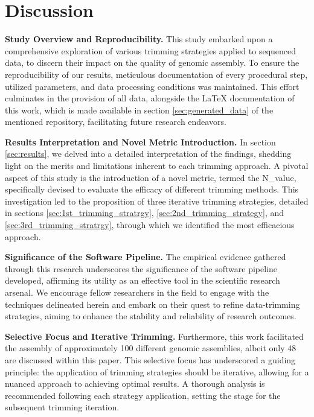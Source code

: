 \chapter{Discussion}

\textbf{Study Overview and Reproducibility.} This study embarked upon a comprehensive exploration of various trimming strategies applied to sequenced data, to discern their impact on the quality of genomic assembly. To ensure the reproducibility of our results, meticulous documentation of every procedural step, utilized parameters, and data processing conditions was maintained. This effort culminates in the provision of all data, alongside the LaTeX documentation of this work, which is made available in section \ref{sec:generated_data} of the mentioned repository, facilitating future research endeavors.

\textbf{Results Interpretation and Novel Metric Introduction.} In section \ref{sec:results}, we delved into a detailed interpretation of the findings, shedding light on the merits and limitations inherent to each trimming approach. A pivotal aspect of this study is the introduction of a novel metric, termed the N\_value, specifically devised to evaluate the efficacy of different trimming methods. This investigation led to the proposition of three iterative trimming strategies, detailed in sections \ref{sec:1st_trimming_stratrgy}, \ref{sec:2nd_trimming_strategy}, and \ref{sec:3rd_trimming_stratrgy}, through which we identified the most efficacious approach.

\textbf{Significance of the Software Pipeline.} The empirical evidence gathered through this research underscores the significance of the software pipeline developed, affirming its utility as an effective tool in the scientific research arsenal. We encourage fellow researchers in the field to engage with the techniques delineated herein and embark on their quest to refine data-trimming strategies, aiming to enhance the stability and reliability of research outcomes.

\textbf{Selective Focus and Iterative Trimming.} Furthermore, this work facilitated the assembly of approximately 100 different genomic assemblies, albeit only 48 are discussed within this paper. This selective focus has underscored a guiding principle: the application of trimming strategies should be iterative, allowing for a nuanced approach to achieving optimal results. A thorough analysis is recommended following each strategy application, setting the stage for the subsequent trimming iteration.


